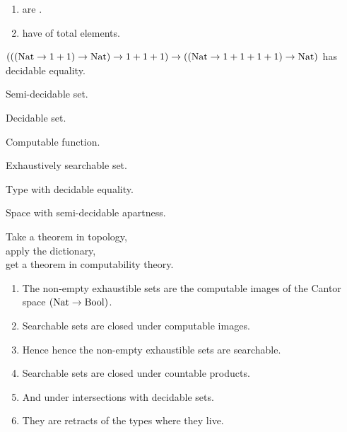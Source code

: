 \documentclass%
[%
Screen4to3,
]{foils}
\begin{document}
\noindent{}

\begin{enumerate}
\item[\grey{1.}] 
 are .
\item[\grey{2.}]
 have  of total elements.
\end{enumerate}

\vfill

\noindent 
{} $(((\operatorname{Nat} \to 1+1) \to \operatorname{Nat}) \to 1+1+1) \to ((\operatorname{Nat} \to 1+1+1+1) \to \operatorname{Nat})$
has decidable equality.


 Semi-decidable set.

 Decidable set.

 Computable function.

 Exhaustively searchable set.

 Type with decidable equality.

 Space with semi-decidable apartness.

\vfill
\noindent
Take a theorem in topology, \\
apply the dictionary, \\
get a theorem in computability theory. \\


\begin{enumerate}
\item[\grey{1.}] The non-empty exhaustible sets are the computable images of the
  Cantor space $(\operatorname{Nat} \to \operatorname{Bool})$.
\item[\grey{2.}] Searchable sets are closed under computable images.
\item[\grey{3.}] Hence hence the non-empty exhaustible sets are searchable. 


\item[\grey{4.}] Searchable sets are closed under countable products.


\item[\grey{5.}] And under intersections with decidable sets. 
\item[\grey{6.}] They are retracts of the types where they live. 
\end{enumerate}
\end{document}
